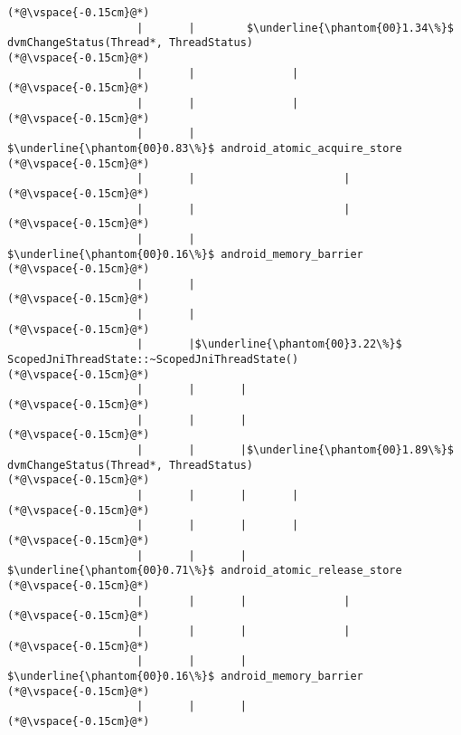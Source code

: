 \begin{lstlisting}[caption=Unicode-merkkijonon kopiointi C$\to$Java, label=profile:C2JCopyUnicode-512, numberbychapter=true, frame=lines, float, floatplacement=t]
(*@\vspace{-0.15cm}@*)
                    |       |        $\underline{\phantom{00}1.34\%}$ dvmChangeStatus(Thread*, ThreadStatus)
(*@\vspace{-0.15cm}@*)
                    |       |               |
(*@\vspace{-0.15cm}@*)
                    |       |               |
(*@\vspace{-0.15cm}@*)
                    |       |                $\underline{\phantom{00}0.83\%}$ android_atomic_acquire_store
(*@\vspace{-0.15cm}@*)
                    |       |                       |
(*@\vspace{-0.15cm}@*)
                    |       |                       |
(*@\vspace{-0.15cm}@*)
                    |       |                        $\underline{\phantom{00}0.16\%}$ android_memory_barrier
(*@\vspace{-0.15cm}@*)
                    |       |
(*@\vspace{-0.15cm}@*)
                    |       |
(*@\vspace{-0.15cm}@*)
                    |       |$\underline{\phantom{00}3.22\%}$ ScopedJniThreadState::~ScopedJniThreadState()
(*@\vspace{-0.15cm}@*)
                    |       |       |
(*@\vspace{-0.15cm}@*)
                    |       |       |
(*@\vspace{-0.15cm}@*)
                    |       |       |$\underline{\phantom{00}1.89\%}$ dvmChangeStatus(Thread*, ThreadStatus)
(*@\vspace{-0.15cm}@*)
                    |       |       |       |
(*@\vspace{-0.15cm}@*)
                    |       |       |       |
(*@\vspace{-0.15cm}@*)
                    |       |       |        $\underline{\phantom{00}0.71\%}$ android_atomic_release_store
(*@\vspace{-0.15cm}@*)
                    |       |       |               |
(*@\vspace{-0.15cm}@*)
                    |       |       |               |
(*@\vspace{-0.15cm}@*)
                    |       |       |                $\underline{\phantom{00}0.16\%}$ android_memory_barrier
(*@\vspace{-0.15cm}@*)
                    |       |       |
(*@\vspace{-0.15cm}@*)

\end{lstlisting}
